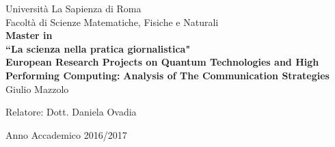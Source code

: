 \begin{titlepage}

 \vspace{20mm}
 
 \begin{center}
   Universit\`a La Sapienza di Roma\\
   Facolt\`a di Scienze Matematiche, Fisiche e Naturali \\
   \vspace{10mm}
   \textbf{Master in}\\
   \textbf{``La scienza nella pratica giornalistica"}\\
   \vspace{20mm}
   \large \textbf{European Research Projects on Quantum Technologies and High Performing Computing:}
   \large \textbf{Analysis of The Communication Strategies}\\
   \vspace{10mm}
   Giulio Mazzolo
 \end{center} 
 

 

 \vspace{10mm}

 \begin{flushleft}
   Relatore: Dott. Daniela Ovadia
 \end{flushleft}

 \vspace{10mm}
 
 \begin{center}
   Anno Accademico 2016/2017
 \end{center}
 

\end{titlepage}
